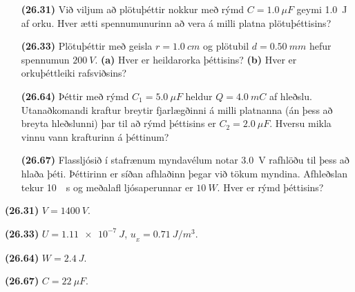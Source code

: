 \begin{enumerate}[label = \textbf{(\alph*)}]

\item[\textbf{(26.31)}] Við viljum að plötuþéttir nokkur með rýmd $C = \SI{1.0}{\mu F}$ geymi \SI{1.0}{J} af orku. Hver ætti spennumunurinn að vera á milli platna plötuþéttisins?

\item[\textbf{(26.33)}] Plötuþéttir með geisla $r = \SI{1.0}{cm}$ og plötubil $d = \SI{0.50}{mm}$ hefur spennumun $\SI{200}{V}$. \textbf{(a)} Hver er heildarorka þéttisins? \textbf{(b)} Hver er orkuþéttleiki rafsviðsins?

\item[\textbf{(26.64)}] Þéttir með rýmd $C_1 = \SI{5.0}{\mu F}$ heldur $Q = \SI{4.0}{mC}$ af hleðslu. Utanaðkomandi kraftur breytir fjarlægðinni á milli platnanna (án þess að breyta hleðslunni) þar til að rýmd þéttisins er $C_2 = \SI{2.0}{\mu F}$. Hversu mikla vinnu vann krafturinn á þéttinum?

\item[\textbf{(26.67)}] Flassljósið í stafrænum myndavélum notar \SI{3.0}{V} rafhlöðu til þess að hlaða þéti. Þéttirinn er síðan afhlaðinn þegar við tökum myndina. Afhleðslan tekur \SI{10}{\mu s} og meðalafl ljósaperunnar er $\SI{10}{W}$. Hver er rýmd þéttisins?


\end{enumerate}

\begin{tcolorbox}
\begin{enumerate*}[label = \vspace{0.15cm} ]
  \item \textbf{(26.31)} $V = \SI{1400}{V}$.
  \item \textbf{(26.33)} $U = \SI{1.11e-7}{J}$, $u_{\!_E} = \SI{0.71}{J/m^3}$.
  \item \textbf{(26.64)} $W = \SI{2.4}{J}$. \\
  \item \textbf{(26.67)} $C = \SI{22}{\mu F}$.
\end{enumerate*}
\end{tcolorbox}

\newpage